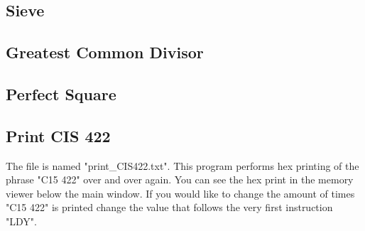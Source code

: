 \documentclass[a3paper, 11pt]{article}
\begin{document}
\subsection{Sieve}
\subsection{Greatest Common Divisor}
\subsection{Perfect Square}
\subsection{Print CIS 422}
The file is named "print\_CIS422.txt". This program performs hex printing of the phrase "C15 422" over and over again. You can see the hex print in the memory viewer below the main window. If you would like to change the amount of times "C15 422" is printed change the value that follows the very first instruction "LDY".
\clearpage
\end{document}
